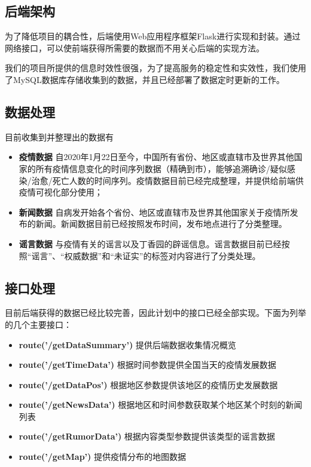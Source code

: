 \documentclass{article}
\begin{document}
\subsection{后端架构}
为了降低项目的耦合性，后端使用Web应用程序框架Flask进行实现和封装。通过网络接口，可以使前端获得所需要的数据而不用关心后端的实现方法。

我们的项目所提供的信息时效性很强，为了提高服务的稳定性和实效性，我们使用了MySQL数据库存储收集到的数据，并且已经部署了数据定时更新的工作。

\subsection{数据处理}
目前收集到并整理出的数据有
\begin{itemize}
	\item{\textbf{疫情数据}} 自2020年1月22日至今，中国所有省份、地区或直辖市及世界其他国家的所有疫情信息变化的时间序列数据（精确到市），能够追溯确诊/疑似感染/治愈/死亡人数的时间序列。疫情数据目前已经完成整理，并提供给前端供疫情可视化部分使用；
	\item{\textbf{新闻数据}} 自病发开始各个省份、地区或直辖市及世界其他国家关于疫情所发布的新闻。新闻数据目前已经按照发布时间，发布地点进行了分类整理。
	\item{\textbf{谣言数据}} 与疫情有关的谣言以及丁香园的辟谣信息。谣言数据目前已经按照“谣言”、“权威数据”和“未证实”的标签对内容进行了分类处理。
\end{itemize}

\subsection{接口处理}

目前后端获得的数据已经比较完善，因此计划中的接口已经全部实现。下面为列举的几个主要接口：
\begin{itemize}
	\item{\textbf{route('/getDataSummary')}} 提供后端数据收集情况概览 
	\item{\textbf{route('/getTimeData')}} 根据时间参数提供全国当天的疫情发展数据
	\item{\textbf{route('/getDataPos')}} 根据地区参数提供该地区的疫情历史发展数据
	\item{\textbf{route('/getNewsData')}} 根据地区和时间参数获取某个地区某个时刻的新闻列表
	\item{\textbf{route('/getRumorData')}} 根据内容类型参数提供该类型的谣言数据
	\item{\textbf{route('/getMap')}} 提供疫情分布的地图数据
\end{itemize}
\end{document}
